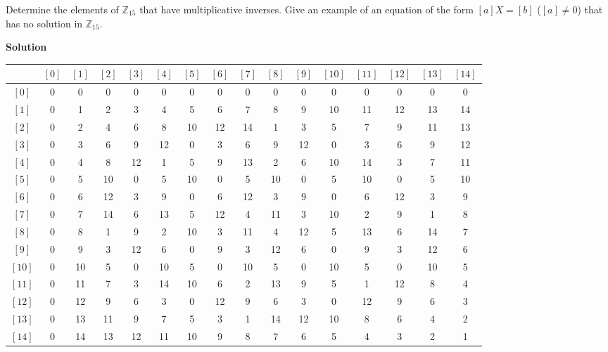 \begin{tcolorbox}[title=Problem 2, breakable]
    Determine the elements of $\mathbb{Z}_{15}$ that have multiplicative inverses.
    Give an example of an equation of the form $[a]X = [b]$ ($[a] \not = 0$)
    that has no solution in $\mathbb{Z}_{15}$.
\end{tcolorbox}

\textbf{Solution}

\begin{center}
\begin{tabular}{c | *{15}{c@{\hskip 2pt}}}
 & $[0]$ & $[1]$ & $[2]$ & $[3]$ & $[4]$ & $[5]$ & $[6]$ & $[7]$ & $[8]$ & $[9]$ & $[10]$ & $[11]$ & $[12]$ & $[13]$ & $[14]$ \\
\hline
$[0]$  & 0 & 0 & 0 & 0 & 0 & 0 & 0 & 0 & 0 & 0 & 0 & 0 & 0 & 0 & 0 \\
$[1]$  & 0 & 1 & 2 & 3 & 4 & 5 & 6 & 7 & 8 & 9 & 10 & 11 & 12 & 13 & 14 \\
$[2]$  & 0 & 2 & 4 & 6 & 8 & 10 & 12 & 14 & 1 & 3 & 5 & 7 & 9 & 11 & 13 \\
$[3]$  & 0 & 3 & 6 & 9 & 12 & 0 & 3 & 6 & 9 & 12 & 0 & 3 & 6 & 9 & 12 \\
$[4]$  & 0 & 4 & 8 & 12 & 1 & 5 & 9 & 13 & 2 & 6 & 10 & 14 & 3 & 7 & 11 \\
$[5]$  & 0 & 5 & 10 & 0 & 5 & 10 & 0 & 5 & 10 & 0 & 5 & 10 & 0 & 5 & 10 \\
$[6]$  & 0 & 6 & 12 & 3 & 9 & 0 & 6 & 12 & 3 & 9 & 0 & 6 & 12 & 3 & 9 \\
$[7]$  & 0 & 7 & 14 & 6 & 13 & 5 & 12 & 4 & 11 & 3 & 10 & 2 & 9 & 1 & 8 \\
$[8]$  & 0 & 8 & 1 & 9 & 2 & 10 & 3 & 11 & 4 & 12 & 5 & 13 & 6 & 14 & 7 \\
$[9]$  & 0 & 9 & 3 & 12 & 6 & 0 & 9 & 3 & 12 & 6 & 0 & 9 & 3 & 12 & 6 \\
$[10]$ & 0 & 10 & 5 & 0 & 10 & 5 & 0 & 10 & 5 & 0 & 10 & 5 & 0 & 10 & 5 \\
$[11]$ & 0 & 11 & 7 & 3 & 14 & 10 & 6 & 2 & 13 & 9 & 5 & 1 & 12 & 8 & 4 \\
$[12]$ & 0 & 12 & 9 & 6 & 3 & 0 & 12 & 9 & 6 & 3 & 0 & 12 & 9 & 6 & 3 \\
$[13]$ & 0 & 13 & 11 & 9 & 7 & 5 & 3 & 1 & 14 & 12 & 10 & 8 & 6 & 4 & 2 \\
$[14]$ & 0 & 14 & 13 & 12 & 11 & 10 & 9 & 8 & 7 & 6 & 5 & 4 & 3 & 2 & 1 \\
\end{tabular}
\end{center}

